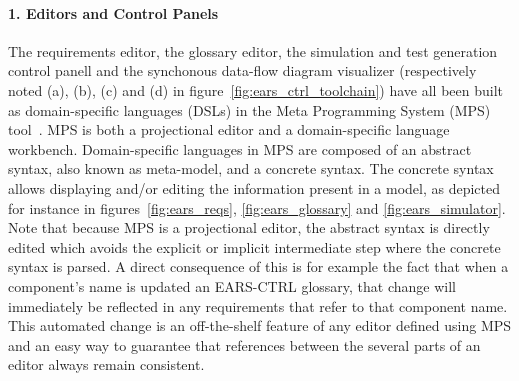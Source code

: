 \paragraph{\textbf{1. Editors and Control Panels}\\} 
\hspace{-.2cm}
The requirements editor, the glossary editor, the simulation and
test generation control panell and the synchonous data-flow diagram visualizer (respectively
noted (\textsf{a}), (\textsf{b}), (\textsf{c}) and (\textsf{d}) in figure~\ref{fig:ears_ctrl_toolchain}) have all been built as 
domain-specific languages (DSLs) in the Meta Programming System (MPS)
tool~\cite{mps}.
MPS is both a projectional editor and a domain-specific language workbench.
Domain-specific languages in MPS are composed of an abstract syntax, also known
as meta-model, and a concrete syntax. The concrete syntax allows displaying
and/or editing the information present in a model, as depicted for instance in
figures~\ref{fig:ears_reqs}, \ref{fig:ears_glossary} and
\ref{fig:ears_simulator}. Note that because MPS is a projectional editor, the
abstract syntax is directly edited which avoids the explicit or implicit
intermediate step where the concrete syntax is parsed.
A direct consequence of this is for example the fact that when a component's
name is updated an \textsf{EARS-CTRL} glossary, that change will immediately be
reflected in any requirements that refer to that component name. This automated
change is an off-the-shelf feature of any editor defined using MPS and an easy
way to guarantee that references between the several parts of an editor always
remain consistent.\vspace{-.2cm}

